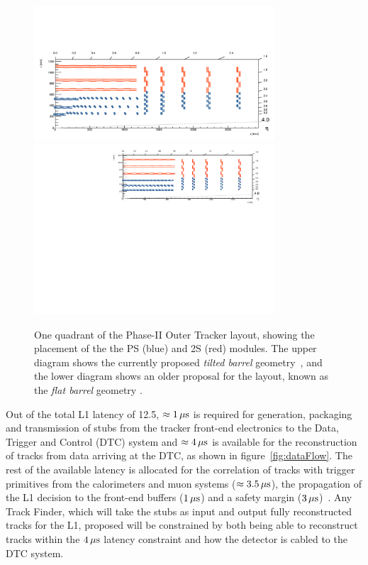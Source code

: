 \begin{figure}[tbp]
\centering
\includegraphics[width=0.8\textwidth,trim={1.1truecm 0truecm 1truecm 12truecm},clip]{figs/tk-upgrade/tiltedbarrelmap.pdf}
\includegraphics[width=0.8\textwidth,trim={0.7truecm 0truecm 1truecm 0truecm},clip]{figs/tk-upgrade/mersilayout.pdf}
\caption{One quadrant of the Phase-II Outer Tracker layout, showing the placement of the the PS (blue) and 2S (red) modules. The upper diagram shows the currently proposed \emph{tilted barrel} geometry~\cite{tiltedGeometry, P2TrackerTDR}, and the lower diagram shows an older proposal for the layout, known as the \emph{flat barrel} geometry \cite{CMS_Upgrade_TP}.}
\label{fig:trackerlayout}
\end{figure}

Out of the total L1 latency of 12.5\mus, $\approx 1\,\mu\text{s}$ is required for generation, packaging and transmission of stubs from the tracker front-end electronics to the Data, Trigger and Control (DTC) system and $\approx 4\,\mu\text{s}$ is available for the reconstruction of tracks from data arriving at the DTC, as shown in figure~\ref{fig:dataFlow}.
The rest of the available latency is allocated for the correlation of tracks with trigger primitives from the calorimeters and muon systems ($\approx 3.5\,\mu\text{s}$), the propagation of the L1 decision to the front-end buffers ($1\,\mu\text{s}$) and a safety margin ($3\,\mu\text{s}$)~\cite{CMS_Upgrade_TP}.
Any Track Finder, which will take the stubs as input and output fully reconstructed tracks for the L1, proposed will be constrained by both being able to reconstruct tracks within the $4\,\mu\text{s}$ latency constraint and how the detector is cabled to the DTC system.

